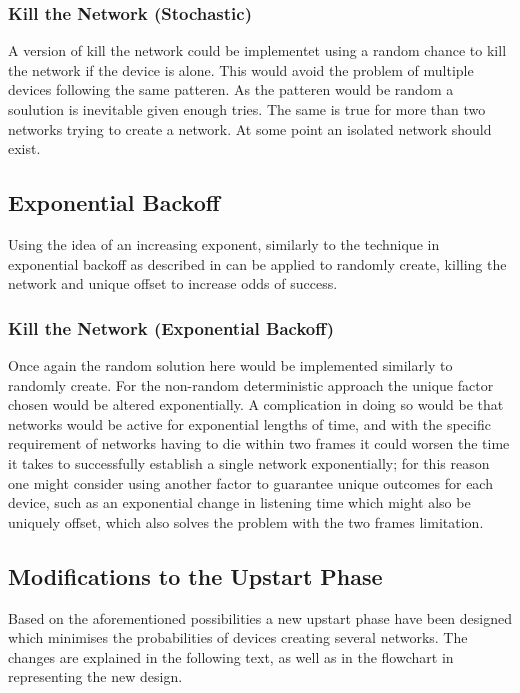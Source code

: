 \subsubsection{Kill the Network (Stochastic)}\label{KtNR}
A version of kill the network could be implementet using a random chance to kill the network if the device is alone.
This would avoid the problem of multiple devices following the same patteren.
As the patteren would be random a soulution is inevitable given enough tries.
The same is true for more than two networks trying to create a network.
At some point an isolated network should exist.

\subsection{Exponential Backoff} 
Using the idea of an increasing exponent, similarly to the technique in exponential backoff as described in  can be applied to randomly create, killing the network and unique offset to increase odds of success.

\subsubsection{Kill the Network (Exponential Backoff)}
Once again the random solution here would be implemented similarly to randomly create.
For the non-random deterministic approach the unique factor chosen would be altered exponentially.
A complication in doing so would be that networks would be active for exponential lengths of time, and with the specific requirement of networks having to die within two frames it could worsen the time it takes to successfully establish a single network exponentially; for this reason one might consider using another factor to guarantee unique outcomes for each device, such as an exponential change in listening time which might also be uniquely offset, which also solves the problem with the two frames limitation.

\subsection{Modifications to the Upstart Phase}                 
Based on the aforementioned possibilities a new upstart phase have been designed which minimises the probabilities of devices creating several networks.
The changes are explained in the following text, as well as in the flowchart in  representing the new design.

